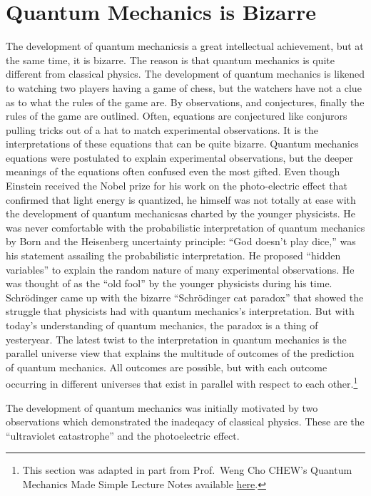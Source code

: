 \documentclass[
  9pt,
]{extbook}
\begin{document}
\hypertarget{quantum-mechanics-is-bizarre}{%
\section{Quantum Mechanics is Bizarre}\label{quantum-mechanics-is-bizarre}}

The development of quantum mechanicsis a great intellectual achievement, but at the same time, it is bizarre. The reason is that quantum mechanics is quite different from classical physics. The development of quantum mechanics is likened to watching two players having a game of chess, but the watchers have not a clue as to what the rules of the game are. By observations, and conjectures, finally the rules of the game are outlined. Often, equations are conjectured like conjurors pulling tricks out of a hat to match experimental observations. It is the interpretations of these equations that can be quite bizarre.
Quantum mechanics equations were postulated to explain experimental observations, but the deeper meanings of the equations often confused even the most gifted. Even though Einstein received the Nobel prize for his work on the photo-electric effect that confirmed that light energy is quantized, he himself was not totally at ease with the development of quantum mechanicsas charted by the younger physicists. He was never comfortable with the probabilistic interpretation of quantum mechanics by Born and the Heisenberg uncertainty principle: ``God doesn't play dice,'' was his statement assailing the probabilistic interpretation. He proposed ``hidden variables'' to explain the random nature of many experimental observations. He was thought of as the ``old fool'' by the younger physicists during his time.
Schrödinger came up with the bizarre ``Schrödinger cat paradox'' that showed the struggle that physicists had with quantum mechanics's interpretation. But with today's understanding of quantum mechanics, the paradox is a thing of yesteryear.
The latest twist to the interpretation in quantum mechanics is the parallel universe view that explains the multitude of outcomes of the prediction of quantum mechanics. All outcomes are possible, but with each outcome occurring in different universes that exist in parallel with respect to each other.\footnote{This section was adapted in part from Prof.~Weng Cho CHEW's Quantum Mechanics Made Simple Lecture Notes available \href{http://wcchew.ece.illinois.edu/chew/course/qmall20121005.pdf}{here}.}

The development of quantum mechanics was initially motivated by two observations which demonstrated the inadeqacy of classical physics. These are the ``ultraviolet catastrophe'' and the photoelectric effect.
\end{document}

